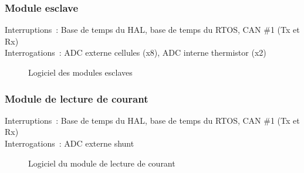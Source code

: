 	\subsubsection*{Module esclave}
		\noindent
		Interruptions : Base de temps du HAL, base de temps du RTOS, CAN \#1 (Tx et Rx) \\
		Interrogations : ADC externe cellules (x8), ADC interne thermistor (x2)
		\begin{figure}[H]
			\centering
			\caption{Logiciel des modules esclaves}
			\label{fig:logiciel_slave}
		\end{figure}
	
	\newpage
	\subsubsection*{Module de lecture de courant}
		\noindent
		Interruptions : Base de temps du HAL, base de temps du RTOS, CAN \#1 (Tx et Rx) \\
		Interrogations : ADC externe shunt
		\begin{figure}[H]
			\centering
			\caption{Logiciel du module de lecture de courant}
			\label{fig:logiciel_current_sense}
		\end{figure}
